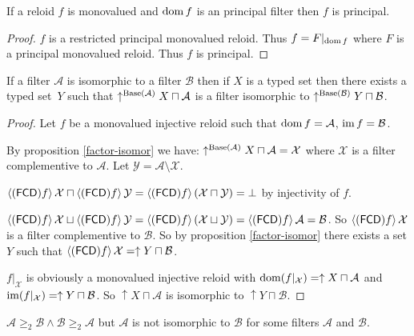 \begin{thm}
If a reloid $f$ is monovalued and $\operatorname{dom} f$ is an principal filter
then $f$ is principal.\end{thm}
\begin{proof}
$f$ is a restricted principal monovalued reloid. Thus $f=F|_{\operatorname{dom} f}$
where $F$ is a principal monovalued reloid. Thus $f$ is principal.\end{proof}
\begin{lem}
If a filter $\mathcal{A}$ is isomorphic to a filter $\mathcal{B}$
then if $X$ is a typed set then there exists a typed set~$Y$ such that $\uparrow^{\operatorname{Base}(\mathcal{A})}X\sqcap\mathcal{A}$
is a filter isomorphic to $\uparrow^{\operatorname{Base}(\mathcal{B})}Y\sqcap\mathcal{B}$.\end{lem}
\begin{proof}
Let $f$ be a monovalued injective reloid such that $\operatorname{dom} f=\mathcal{A}$,
$\operatorname{im} f=\mathcal{B}$.

By proposition \ref{factor-isomor} we have: $\uparrow^{\operatorname{Base}(\mathcal{A})}X\sqcap\mathcal{A}=\mathcal{X}$
where $\mathcal{X}$ is a filter complementive to $\mathcal{A}$.
Let $\mathcal{Y}=\mathcal{A}\setminus\mathcal{X}$.

$\left\langle (\mathsf{FCD}) f\right\rangle\mathcal{X}\sqcap\left\langle (\mathsf{FCD}) f\right\rangle\mathcal{Y}=\left\langle (\mathsf{FCD}) f\right\rangle(\mathcal{X}\sqcap\mathcal{Y})=\bot$
by injectivity of $f$.

$\left\langle (\mathsf{FCD}) f\right\rangle\mathcal{X}\sqcup\left\langle (\mathsf{FCD}) f\right\rangle\mathcal{Y}=\left\langle (\mathsf{FCD}) f\right\rangle(\mathcal{X}\sqcup\mathcal{Y})=\left\langle (\mathsf{FCD}) f\right\rangle\mathcal{A}=\mathcal{B}$.
So $\left\langle (\mathsf{FCD}) f\right\rangle\mathcal{X}$ is a filter complementive to $\mathcal{B}$.
So by proposition \ref{factor-isomor} there exists a set $Y$ such
that $\left\langle (\mathsf{FCD}) f\right\rangle\mathcal{X}=\uparrow Y\sqcap\mathcal{B}$.

$f|_{\mathcal{X}}$ is obviously a monovalued injective reloid with
$\operatorname{dom}(f|_{\mathcal{X}})=\uparrow X\sqcap\mathcal{A}$
and $\operatorname{im}(f|_{\mathcal{X}})=\uparrow Y\sqcap\mathcal{B}$.
So $\uparrow X\sqcap\mathcal{A}$ is isomorphic
to $\uparrow Y\sqcap\mathcal{B}$.\end{proof}
\begin{example}
$\mathcal{A}\ge_{2}\mathcal{B}\wedge\mathcal{B}\ge_{2}\mathcal{A}$
but $\mathcal{A}$ is not isomorphic to $\mathcal{B}$ for some filters
$\mathcal{A}$ and $\mathcal{B}$.\end{example}
